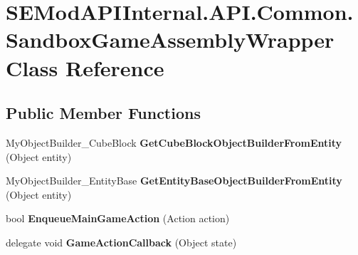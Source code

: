 \hypertarget{class_s_e_mod_a_p_i_internal_1_1_a_p_i_1_1_common_1_1_sandbox_game_assembly_wrapper}{}\section{S\+E\+Mod\+A\+P\+I\+Internal.\+A\+P\+I.\+Common.\+Sandbox\+Game\+Assembly\+Wrapper Class Reference}
\label{class_s_e_mod_a_p_i_internal_1_1_a_p_i_1_1_common_1_1_sandbox_game_assembly_wrapper}
\subsection*{Public Member Functions}
\begin{DoxyCompactItemize}
\item 
\hypertarget{class_s_e_mod_a_p_i_internal_1_1_a_p_i_1_1_common_1_1_sandbox_game_assembly_wrapper_a9effc3e337718bb045e8759c3f5db118}{}My\+Object\+Builder\+\_\+\+Cube\+Block {\bfseries Get\+Cube\+Block\+Object\+Builder\+From\+Entity} (Object entity)\label{class_s_e_mod_a_p_i_internal_1_1_a_p_i_1_1_common_1_1_sandbox_game_assembly_wrapper_a9effc3e337718bb045e8759c3f5db118}

\item 
\hypertarget{class_s_e_mod_a_p_i_internal_1_1_a_p_i_1_1_common_1_1_sandbox_game_assembly_wrapper_a867f3521a3128239d0f3f936096d7467}{}My\+Object\+Builder\+\_\+\+Entity\+Base {\bfseries Get\+Entity\+Base\+Object\+Builder\+From\+Entity} (Object entity)\label{class_s_e_mod_a_p_i_internal_1_1_a_p_i_1_1_common_1_1_sandbox_game_assembly_wrapper_a867f3521a3128239d0f3f936096d7467}

\item 
\hypertarget{class_s_e_mod_a_p_i_internal_1_1_a_p_i_1_1_common_1_1_sandbox_game_assembly_wrapper_adc90d1232363fea21ab80966e70ec62a}{}bool {\bfseries Enqueue\+Main\+Game\+Action} (Action action)\label{class_s_e_mod_a_p_i_internal_1_1_a_p_i_1_1_common_1_1_sandbox_game_assembly_wrapper_adc90d1232363fea21ab80966e70ec62a}

\item 
\hypertarget{class_s_e_mod_a_p_i_internal_1_1_a_p_i_1_1_common_1_1_sandbox_game_assembly_wrapper_a125d3c48bbcd7ad51e69a77d0f62df3c}{}delegate void {\bfseries Game\+Action\+Callback} (Object state)\label{class_s_e_mod_a_p_i_internal_1_1_a_p_i_1_1_common_1_1_sandbox_game_assembly_wrapper_a125d3c48bbcd7ad51e69a77d0f62df3c}


\end{DoxyCompactItemize}

